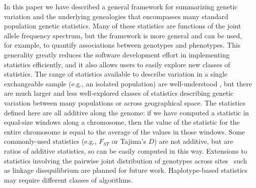 \documentclass[9pt,twoside,lineno]{gsajnl}
\newcommand{\tiw}{w_\text{total}} %
\begin{document}
In this paper we have described a general framework for summarizing genetic variation
and the underlying genealogies
that encompasses many standard population genetic statistics.
Many of these statistics are functions of the joint allele frequency spectrum,
but the framework is more general and can be used,
for example, to quantify associations between genotypes and phenotypes.
This generality greatly reduces the software development effort in
implementing statistics efficiently,
and it also allows users to easily explore new classes of statistics.
The range of statistics available to describe variation in a single exchangeable sample
(e.g., an isolated population) are well-understood
\citep{achaz2009frequency,ferretti2017decomposing},
but there are much larger and less well-explored classes of statistics
describing genetic variation between many populations
or across geographical space.
The statistics defined here are all additive along the genome:
if we have computed a statistic in equal-size windows along a chromosome,
then the value of the statistic for the entire chromosome is equal to
the average of the values in those windows.
Some commonly-used statistics (e.g., $F_{ST}$ or Tajima's $D$)
are not additive, but are ratios of additive statistics, so can be easily computed in this way.
Extensions to statistics involving the pairwise joint distribution of genotypes across
sites~\citep{hudson2001twolocus} such as linkage disequilibrium are planned for future work.
Haplotype-based statistics may require different classes of algorithms.

\end{document}
